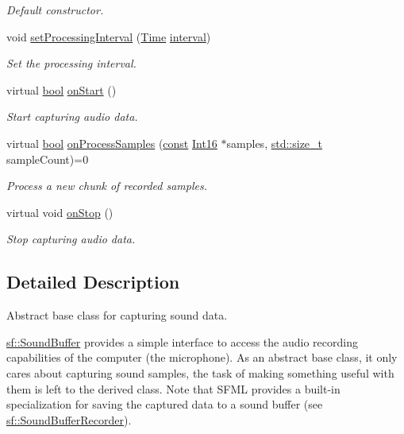 \begin{DoxyCompactItemize}
\begin{DoxyCompactList}\small\item\em Default constructor. \end{DoxyCompactList}\item 
void \hyperlink{classsf_1_1_sound_recorder_a85b7fb8a86c08b5084f8f142767bccf6}{set\-Processing\-Interval} (\hyperlink{classsf_1_1_time}{Time} \hyperlink{structinterval}{interval})
\begin{DoxyCompactList}\small\item\em Set the processing interval. \end{DoxyCompactList}\item 
virtual \hyperlink{term__entry_8h_a002004ba5d663f149f6c38064926abac}{bool} \hyperlink{classsf_1_1_sound_recorder_a7af418fb036201d3f85745bef78ce77f}{on\-Start} ()
\begin{DoxyCompactList}\small\item\em Start capturing audio data. \end{DoxyCompactList}\item 
virtual \hyperlink{term__entry_8h_a002004ba5d663f149f6c38064926abac}{bool} \hyperlink{classsf_1_1_sound_recorder_a2670124cbe7a87c7e46b4840807f4fd7}{on\-Process\-Samples} (\hyperlink{term__entry_8h_a57bd63ce7f9a353488880e3de6692d5a}{const} \hyperlink{namespacesf_a3c8e10435e2a310a7741755e66b5c94e}{Int16} $\ast$samples, \hyperlink{nc__alloc_8h_a7b60c5629e55e8ec87a4547dd4abced4}{std\-::size\-\_\-t} sample\-Count)=0
\begin{DoxyCompactList}\small\item\em Process a new chunk of recorded samples. \end{DoxyCompactList}\item 
virtual void \hyperlink{classsf_1_1_sound_recorder_aefc36138ca1e96c658301280e4a31b64}{on\-Stop} ()
\begin{DoxyCompactList}\small\item\em Stop capturing audio data. \end{DoxyCompactList}\end{DoxyCompactItemize}


\subsection{Detailed Description}
Abstract base class for capturing sound data. 

\hyperlink{classsf_1_1_sound_buffer}{sf\-::\-Sound\-Buffer} provides a simple interface to access the audio recording capabilities of the computer (the microphone). As an abstract base class, it only cares about capturing sound samples, the task of making something useful with them is left to the derived class. Note that S\-F\-M\-L provides a built-\/in specialization for saving the captured data to a sound buffer (see \hyperlink{classsf_1_1_sound_buffer_recorder}{sf\-::\-Sound\-Buffer\-Recorder}).

